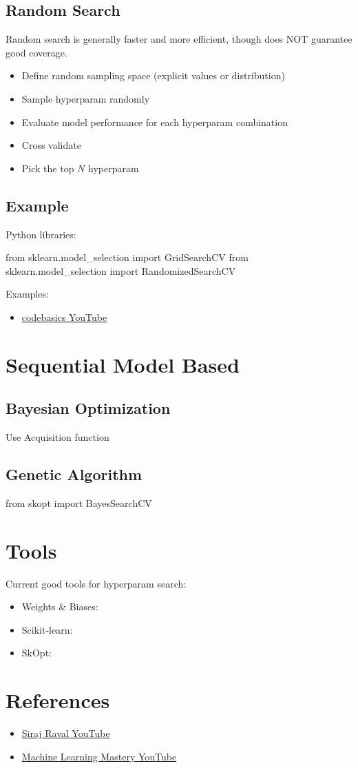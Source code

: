 \subsection{Random Search}
Random search is generally faster and more efficient, though does NOT guarantee good coverage.
\begin{itemize}
	\item Define random sampling space (explicit values or distribution)
	\item Sample hyper\ac{param} randomly
	\item Evaluate model performance for each hyper\ac{param} combination
	\item Cross validate
	\item Pick the top $N$ hyper\ac{param}
\end{itemize}

\subsection{Example}
Python libraries:
\begin{python}
from sklearn.model_selection import GridSearchCV
from sklearn.model_selection import RandomizedSearchCV
\end{python}

Examples:
\begin{itemize}
	\item \href{https://youtu.be/HdlDYng8g9s}{codebasics YouTube}
\end{itemize}

\section{Sequential Model Based}
\subsection{Bayesian Optimization}
Use Acquisition function \todo{}
\subsection{Genetic Algorithm}
\todo{}

\begin{python}
from skopt import BayesSearchCV
\end{python}

\section{Tools}
Current good tools for hyper\ac{param} search:
\begin{itemize}
	\item Weights \& Biases: 
	\item Scikit-learn: 
	\item SkOpt: 
\end{itemize}

\section{References}
\begin{itemize}
	\item \href{https://youtu.be/ttE0F7fghfk}{Siraj Raval YouTube}
	\item \href{https://www.youtube.com/channel/UCS1dQr2X_ComHN4PXYDS4gA}{Machine Learning Mastery YouTube}
\end{itemize}